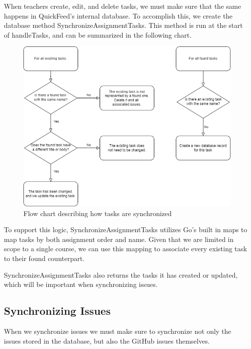When teachers create, edit, and delete tasks, we must make sure that the same happens in QuickFeed's internal database.
To accomplish this, we create the database method SynchronizeAssignmentTasks.
This method is run at the start of handleTasks, and can be summarized in the following chart.

\begin{figure}[ht]
    \centering
    \includegraphics[width=\textwidth]{photos/synchronize-tasks-flow-chart.png}
    \caption{Flow chart describing how tasks are synchronized}
    \label{fig:synchronize-tasks-flow-chart}
\end{figure}

To support this logic, SynchronizeAssignmentTasks utilizes Go's built in maps to map tasks by both assignment order and name.
Given that we are limited in scope to a single course, we can use this mapping to associate every existing task to their found counterpart.



SynchronizeAssignmentTasks also returns the tasks it has created or updated, which will be important when synchronizing issues.

\subsection{Synchronizing Issues}

When we synchronize issues we must make sure to synchronize not only the issues stored in the database, but also the GitHub issues themselves.

